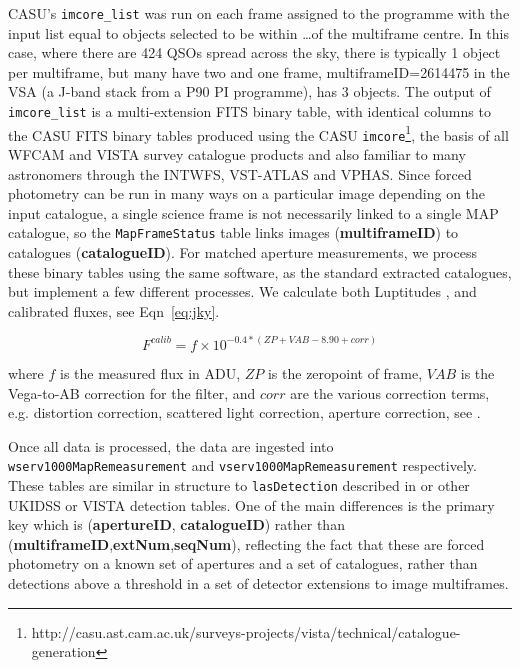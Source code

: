 \documentclass[usenatbib]{mnras}
\begin{document}
    CASU's \verb+imcore_list+ was run on each frame assigned to the programme with
    the input list equal to objects selected to be within \ldots of the multiframe
    centre. In this case, where there are 424 QSOs spread across the sky, there is
    typically 1 object per multiframe, but many have two and one frame,
    multiframeID=2614475 in the VSA (a J-band stack from a P90 PI programme), has 3 objects. 
    The output of \verb+imcore_list+
    is a multi-extension FITS binary table, with identical columns to the CASU FITS
    binary tables produced using the CASU \verb+imcore+\footnote{http://casu.ast.cam.ac.uk/surveys-projects/vista/technical/catalogue-generation}, the basis of all WFCAM and
    VISTA survey catalogue products and also familiar to many astronomers through the INTWFS, 
    VST-ATLAS and VPHAS. Since forced photometry can be run
    in many ways on a particular image depending on the input catalogue, a single science frame is not
    necessarily linked to a single MAP catalogue, so the \verb+MapFrameStatus+ table
    links images ({\bf multiframeID}) to catalogues ({\bf catalogueID}).
    For matched aperture measurements, we process these binary tables using the same
    software, as the standard extracted catalogues, but implement a few different
    processes. We calculate both Luptitudes \citep{Luptitudes}, and calibrated fluxes,
    see Eqn~\ref{eq:jky}. 
    
    \begin{equation}
      F^{calib} = f\times10^{-0.4*(ZP+VAB-8.90+corr)} 
      \label{eq:jky}
    \end{equation}
    
    \noindent where $f$ is the measured flux in ADU, $ZP$ is the zeropoint of
    frame, $VAB$ is the Vega-to-AB correction for the filter, and $corr$ are the
    various correction terms, e.g. distortion correction, scattered light
    correction, aperture correction, see \citep{Hambly2008, Cross2012}. 
    
    Once all data is processed, the data are ingested into
    \verb+wserv1000MapRemeasurement+ and \verb+vserv1000MapRemeasurement+
    respectively. These tables are similar in structure to \verb+lasDetection+
    described in \citep{Hambly2008} or other UKIDSS or VISTA detection tables. One of
    the main differences is the primary key which is ({\bf apertureID},{\bf
      catalogueID}) rather than ({\bf multiframeID},{\bf extNum},{\bf seqNum}),
    reflecting the fact that these are forced photometry on a known set of apertures
    and a set of catalogues, rather than detections above a threshold in a set of
    detector extensions to image multiframes.
    
\end{document}
